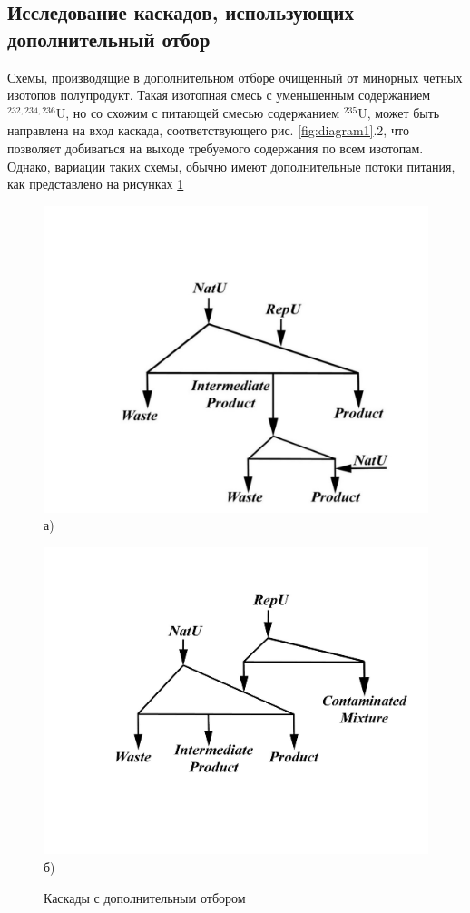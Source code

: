 \subsection{Исследование каскадов, использующих дополнительный отбор}
Схемы, производящие в дополнительном отборе очищенный от минорных четных изотопов полупродукт. Такая изотопная смесь с уменьшенным содержанием $^{232,234,236}$U, но со схожим с питающей смесью содержанием $^{235}$U, может быть направлена на вход каскада, соответствующего рис. \ref{fig:diagram1}.2, что позволяет добиваться на выходе требуемого содержания по всем изотопам. Однако, вариации таких схемы, обычно имеют дополнительные потоки питания, как представлено на рисунках \ref{fig:add}

\begin{figure}[ht]
  \begin{minipage}[b][][b]{0.49\linewidth}\centering
    \includegraphics[width=0.9\linewidth]{cascades/add_p} \\ а)
  \end{minipage}
  \hfill
  \begin{minipage}[b][][b]{0.49\linewidth}\centering
    \includegraphics[width=0.9\linewidth]{cascades/add_p2} \\ б)
  \end{minipage}
  \caption{Каскады с дополнительным отбором}
  \label{fig:add}
\end{figure}

